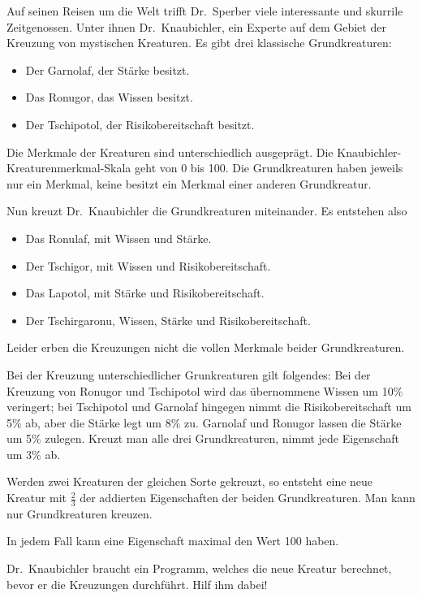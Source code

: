 \begin{aufgabe}
  \label{aufgabe:knaubichler}
  Auf seinen Reisen um die Welt trifft Dr.~Sperber
  viele interessante und skurrile Zeitgenossen. Unter ihnen
  Dr.~Knaubichler, ein Experte auf dem Gebiet der Kreuzung von
  mystischen Kreaturen.  Es gibt drei klassische Grundkreaturen:

  \begin{itemize}
  \item Der Garnolaf, der Stärke besitzt.
  \item Das Ronugor, das Wissen besitzt.
  \item Der Tschipotol, der Risikobereitschaft besitzt.
  \end{itemize}
  
  Die Merkmale der Kreaturen sind unterschiedlich ausgeprägt.  Die
  Knaubichler-Kreaturenmerkmal-Skala geht von 0 bis 100.  Die
  Grundkreaturen haben jeweils nur ein Merkmal, keine besitzt ein
  Merkmal einer anderen Grundkreatur.

  Nun kreuzt Dr.~Knaubichler die Grundkreaturen miteinander. Es
  entstehen also
  \begin{itemize}
  \item Das Ronulaf, mit Wissen und Stärke.
  \item Der Tschigor, mit Wissen und Risikobereitschaft.
  \item Das Lapotol, mit Stärke und Risikobereitschaft.
  \item Der Tschirgaronu, Wissen, Stärke und Risikobereitschaft.
  \end{itemize}
  
  Leider erben die Kreuzungen nicht die vollen Merkmale beider
  Grundkreaturen.

  Bei der Kreuzung unterschiedlicher Grunkreaturen gilt folgendes:
  Bei der Kreuzung von Ronugor und Tschipotol wird
  das übernommene Wissen um 10\% veringert; bei Tschipotol und
  Garnolaf hingegen nimmt die Risikobereitschaft um 5\% ab, aber die
  Stärke legt um 8\% zu. Garnolaf und Ronugor lassen die Stärke um 5\%
  zulegen. Kreuzt man alle drei Grundkreaturen, nimmt jede Eigenschaft
  um 3\% ab.
  
  Werden zwei Kreaturen der gleichen Sorte gekreuzt, so entsteht eine
  neue Kreatur mit $\frac{2}{3}$ der addierten Eigenschaften der
  beiden Grundkreaturen. Man kann nur Grundkreaturen kreuzen.

  In jedem Fall kann eine Eigenschaft maximal den Wert 100
  haben.
    
  Dr.~Knaubichler braucht ein Programm, welches die neue Kreatur
  berechnet, bevor er die Kreuzungen durchführt.  Hilf ihm
  dabei!
  

\end{aufgabe}
